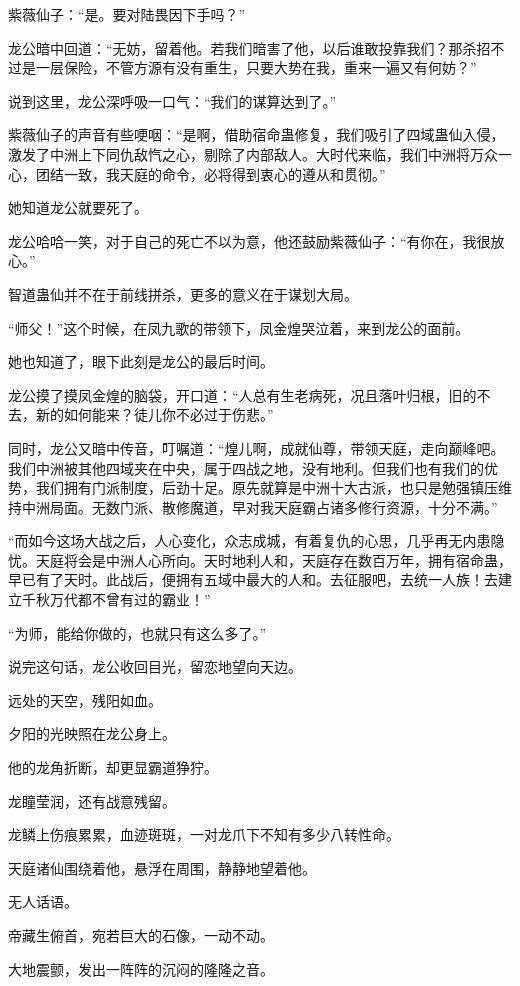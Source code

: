 \begin{this_body}
紫薇仙子：“是。要对陆畏因下手吗？”

龙公暗中回道：“无妨，留着他。若我们暗害了他，以后谁敢投靠我们？那杀招不过是一层保险，不管方源有没有重生，只要大势在我，重来一遍又有何妨？”

说到这里，龙公深呼吸一口气：“我们的谋算达到了。”

紫薇仙子的声音有些哽咽：“是啊，借助宿命蛊修复，我们吸引了四域蛊仙入侵，激发了中洲上下同仇敌忾之心，剔除了内部敌人。大时代来临，我们中洲将万众一心，团结一致，我天庭的命令，必将得到衷心的遵从和贯彻。”

她知道龙公就要死了。

龙公哈哈一笑，对于自己的死亡不以为意，他还鼓励紫薇仙子：“有你在，我很放心。”

智道蛊仙并不在于前线拼杀，更多的意义在于谋划大局。

“师父！”这个时候，在凤九歌的带领下，凤金煌哭泣着，来到龙公的面前。

她也知道了，眼下此刻是龙公的最后时间。

龙公摸了摸凤金煌的脑袋，开口道：“人总有生老病死，况且落叶归根，旧的不去，新的如何能来？徒儿你不必过于伤悲。”

同时，龙公又暗中传音，叮嘱道：“煌儿啊，成就仙尊，带领天庭，走向巅峰吧。我们中洲被其他四域夹在中央，属于四战之地，没有地利。但我们也有我们的优势，我们拥有门派制度，后劲十足。原先就算是中洲十大古派，也只是勉强镇压维持中洲局面。无数门派、散修魔道，早对我天庭霸占诸多修行资源，十分不满。”

“而如今这场大战之后，人心变化，众志成城，有着复仇的心思，几乎再无内患隐忧。天庭将会是中洲人心所向。天时地利人和，天庭存在数百万年，拥有宿命蛊，早已有了天时。此战后，便拥有五域中最大的人和。去征服吧，去统一人族！去建立千秋万代都不曾有过的霸业！”

“为师，能给你做的，也就只有这么多了。”

说完这句话，龙公收回目光，留恋地望向天边。

远处的天空，残阳如血。

夕阳的光映照在龙公身上。

他的龙角折断，却更显霸道狰狞。

龙瞳莹润，还有战意残留。

龙鳞上伤痕累累，血迹斑斑，一对龙爪下不知有多少八转性命。

天庭诸仙围绕着他，悬浮在周围，静静地望着他。

无人话语。

帝藏生俯首，宛若巨大的石像，一动不动。

大地震颤，发出一阵阵的沉闷的隆隆之音。


\end{this_body}
